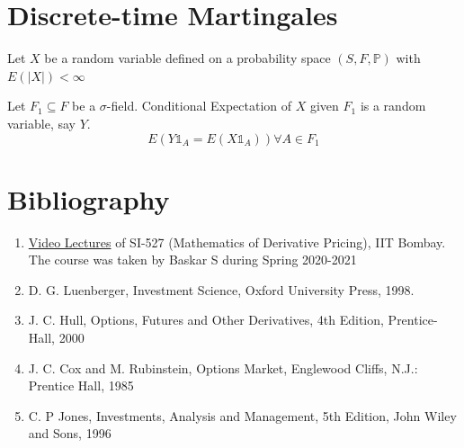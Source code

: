 \documentclass{report}
\begin{document}
\section{Discrete-time Martingales}
Let $X$ be a random variable defined on a probability space $(S, F, \mathbb{P})$ with $E(|X|) < \infty$


Let $F_1 \subseteq F$ be a $\sigma$-field.
Conditional Expectation of $X$ given $F_1$ is a random variable, say $Y$.
\[E(Y\mathbb{1}_A = E(X\mathbb{1}_A)) \forall A \in F_1\] 




\newpage
\mbox{}
\newpage


\clearpage
\clearpage
\section*{Bibliography}
\begin{enumerate}
    \item \href{https://www.youtube.com/playlist?list=PLjAj1Z92T7LTcyjV-Di2_a4mij9_5fKkM}{Video Lectures} of SI-527 (Mathematics of Derivative Pricing), IIT Bombay. The course was taken by Baskar S during Spring 2020-2021
    \item D. G. Luenberger, Investment Science, Oxford University Press, 1998.
    \item J. C. Hull, Options, Futures and Other Derivatives, 4th Edition, Prentice-Hall, 2000
    \item J. C. Cox and M. Rubinstein, Options Market, Englewood Cliffs, N.J.: Prentice Hall, 1985
    \item C. P Jones, Investments, Analysis and Management, 5th Edition, John Wiley and Sons, 1996
\end{enumerate}
\end{document}
